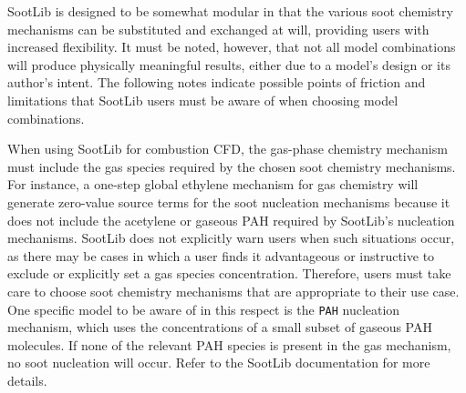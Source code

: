 \documentclass[preprint,letterpaper]{elsarticle}
\begin{document}
SootLib is designed to be somewhat modular in that the various soot chemistry mechanisms can be substituted and exchanged at will, providing users with increased flexibility. It must be noted, however, that not all model combinations will produce physically meaningful results, either due to a model's design or its author's intent. The following notes indicate possible points of friction and limitations that SootLib users must be aware of when choosing model combinations.

When using SootLib for combustion CFD, the gas-phase chemistry mechanism must include the gas species required by the chosen soot chemistry mechanisms. For instance, a one-step global ethylene mechanism for gas chemistry will generate zero-value source terms for the soot nucleation mechanisms because it does not include the acetylene or gaseous PAH required by SootLib's nucleation mechanisms. SootLib does not explicitly warn users when such situations occur, as there may be cases in which a user finds it advantageous or instructive to exclude or explicitly set a gas species concentration. Therefore, users must take care to choose soot chemistry mechanisms that are appropriate to their use case. One specific model to be aware of in this respect is the \texttt{PAH} nucleation mechanism, which uses the concentrations of a small subset of gaseous PAH molecules. If none of the relevant PAH species is present in the gas mechanism, no soot nucleation will occur. Refer to the SootLib documentation for more details.
\end{document}
